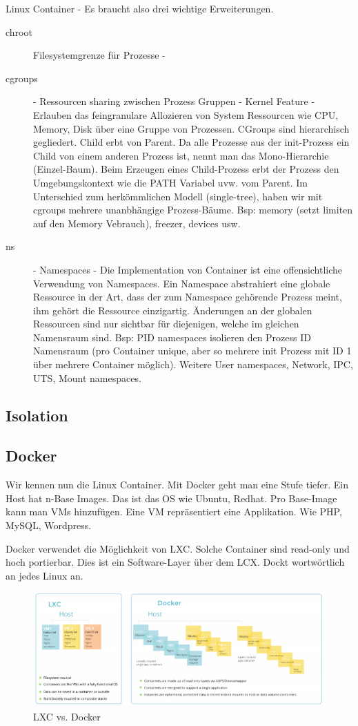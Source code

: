 Linux Container - Es braucht also drei wichtige Erweiterungen.
\begin{description}
	\item[chroot] Filesystemgrenze für Prozesse -
	\item[cgroups]  - Ressourcen sharing zwischen Prozess Gruppen - Kernel Feature - Erlauben das feingranulare Allozieren von System Ressourcen wie CPU, Memory, Disk über eine Gruppe von Prozessen. CGroups sind hierarchisch gegliedert. Child erbt von Parent. Da alle Prozesse aus der init-Prozess ein Child von einem anderen Prozess ist, nennt man das Mono-Hierarchie (Einzel-Baum).  Beim Erzeugen eines Child-Prozess erbt der Prozess den Umgebungskontext wie die PATH Variabel uvw. vom Parent. Im Unterschied zum herkömmlichen Modell (single-tree), haben wir mit cgroups mehrere unanbhängige Prozess-Bäume. Bsp: memory (setzt limiten auf den Memory Vebrauch), freezer, devices usw.
	\item[ns] - Namespaces - Die Implementation von Container ist eine offensichtliche Verwendung von Namespaces. Ein Namespace abstrahiert eine globale Ressource in der Art, dass der zum Namespace gehörende Prozess meint, ihm gehört die Ressource einzigartig. Änderungen an der globalen Ressourcen sind nur sichtbar für diejenigen, welche im gleichen Namensraum sind. Bsp: PID namespaces isolieren den Prozess ID Namensraum (pro Container unique, aber so mehrere init Prozess mit ID 1 über mehrere Container möglich). Weitere User namespaces, Network, IPC, UTS, Mount namespaces.
\end{description} 

\subsection{Isolation}

\subsection{Docker}
Wir kennen nun die Linux Container. Mit Docker geht man eine Stufe tiefer. Ein Host hat n-Base Images. Das ist das OS wie Ubuntu, Redhat. Pro Base-Image kann man VMs hinzufügen. Eine VM repräsentiert eine Applikation. Wie PHP, MySQL, Wordpress.

Docker verwendet die Möglichkeit von LXC. Solche Container sind read-only und hoch portierbar. Dies ist ein Software-Layer über dem LCX. Dockt wortwörtlich an jedes Linux an.

\begin{figure}[h!]
\centering
\includegraphics[width=0.9\linewidth]{fig/lxc-vs-docker}
\caption{LXC vs. Docker}
\label{fig:lxc-vs-docker}
\end{figure}


